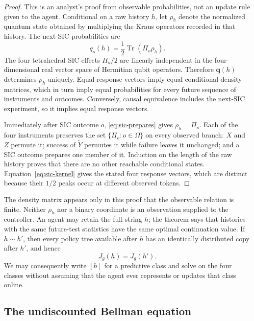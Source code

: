 \documentclass[11pt]{article}
\theoremstyle{definition}
\theoremstyle{remark}
\newcommand{\Tr}{\operatorname{Tr}}
\begin{document}
\begin{proof}
This is an analyst's proof from observable probabilities, not an update rule
given to the agent.  Conditional on a raw history \(h\), let \(\rho_h\) denote
the normalized quantum state obtained by multiplying the Kraus operators
recorded in that history.  The next-SIC probabilities are
\[
 q_o(h)=\frac12\Tr(\Pi_o\rho_h).
\]
The four tetrahedral SIC effects \(\Pi_o/2\) are linearly independent in the
four-dimensional real vector space of Hermitian qubit operators.  Therefore
\(\bm q(h)\) determines \(\rho_h\) uniquely.  Equal response vectors imply
equal conditional density matrices, which in turn imply equal probabilities
for every future sequence of instruments and outcomes.  Conversely, causal
equivalence includes the next-SIC experiment, so it implies equal response
vectors.

Immediately after SIC outcome \(o\), \eqref{eq:sic-prepares} gives
\(\rho_h=\Pi_o\).  Each of the four instruments preserves the set
\(\{\Pi_o:o\in\Omega\}\) on every observed branch: \(X\) and \(Z\) permute
it; success of \(\widetilde Y\) permutes it while failure leaves it unchanged;
and a SIC outcome prepares one member of it.  Induction on the length of the
raw history proves that there are no other reachable conditional states.
Equation~\eqref{eq:sic-kernel} gives the stated four response vectors, which
are distinct because their \(1/2\) peaks occur at different observed tokens.
\end{proof}

The density matrix appears only in this proof that the observable relation is
finite.  Neither \(\rho_h\) nor a binary coordinate is an observation supplied
to the controller.  An agent may retain the full string \(h\); the theorem
says that histories with the same future-test statistics have the same
optimal continuation value.  If \(h\sim h'\), then every policy tree available
after \(h\) has an identically distributed copy after \(h'\), and hence
\[
 J_g(h)=J_g(h').
\]
We may consequently write \([h]\) for a predictive class and solve on the
four classes without assuming that the agent ever represents or updates that
class online.

\subsection{The undiscounted Bellman equation}
\end{document}
